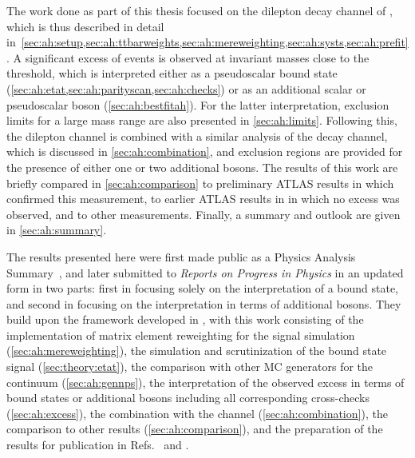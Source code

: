 The work done as part of this thesis focused on the dilepton decay channel of \ttbar, which is thus described in detail in~\cref{sec:ah:setup,sec:ah:ttbarweights,sec:ah:mereweighting,sec:ah:systs,sec:ah:prefit}. A significant excess of events is observed at invariant masses close to the \ttbar threshold, which is interpreted either as a pseudoscalar \ttbar bound state (\cref{sec:ah:etat,sec:ah:parityscan,sec:ah:checks}) or as an additional scalar or pseudoscalar boson (\cref{sec:ah:bestfitah}). For the latter interpretation, exclusion limits for a large mass range are also presented in \cref{sec:ah:limits}. Following this, the dilepton channel is combined with a similar analysis of the \ljets decay channel, which is discussed in \cref{sec:ah:combination}, and exclusion regions are provided for the presence of either one or two additional bosons. The results of this work are briefly compared in \cref{sec:ah:comparison} to preliminary ATLAS results in  which confirmed this measurement, to earlier ATLAS results in  in which no excess was observed, and to other \ttbar measurements. Finally, a summary and outlook are given in \cref{sec:ah:summary}.

The results presented here were first made public as a Physics Analysis Summary~\cite{CMS:HIG-22-013-PAS}, and later submitted to \textit{Reports on Progress in Physics} in an updated form in two parts: first in  focusing solely on the interpretation of a \ttbar bound state, and second in  focusing on the interpretation in terms of additional bosons. 
They build upon the framework developed in , with this work consisting of 
the implementation of matrix element reweighting for the signal simulation (\cref{sec:ah:mereweighting}), the simulation and scrutinization of the \ttbar bound state signal (\cref{sec:theory:etat}), the comparison with other MC generators for the \ttbar continuum (\cref{sec:ah:gennps}), the interpretation of the observed excess in terms of \ttbar bound states or additional bosons including all corresponding cross-checks (\cref{sec:ah:excess}), the combination with the \ljets channel (\cref{sec:ah:combination}), the comparison to other results (\cref{sec:ah:comparison}), and the preparation of the results for publication in Refs.~\cite{CMS:HIG-22-013} and \cite{CMS:TOP-24-007}.

